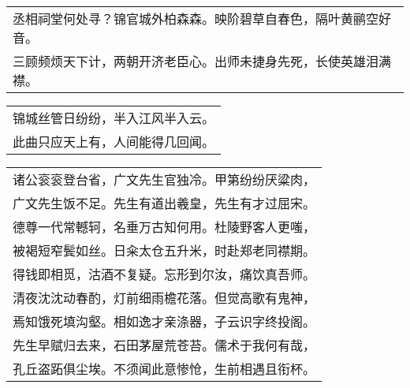 \nopagebreak%
\nopagebreak%
\noindent\begin{minipage}{\linewidth}
  \vskip-3pt\begin{table}[H]
    \centering
    \begin{tabular}{@{}l@{}}
丞相祠堂何处寻？锦官城外柏森森。映阶碧草自春色，隔叶黄鹂空好音。\\
三顾频烦天下计，两朝开济老臣心。出师未捷身先死，长使英雄泪满襟。
    \end{tabular}
  \end{table}
\end{minipage}
\vspace{1cm}


\nopagebreak%
\nopagebreak%
\noindent\begin{minipage}{\linewidth}
  \vskip-3pt\begin{table}[H]
    \centering
    \begin{tabular}{@{}l@{}}
锦城丝管日纷纷，半入江风半入云。\\
此曲只应天上有，人间能得几回闻。
    \end{tabular}
  \end{table}
\end{minipage}
\vspace{1cm}


\nopagebreak%
\nopagebreak%
\noindent\begin{minipage}{\linewidth}
  \vskip-3pt\begin{table}[H]
    \centering
    \begin{tabular}{@{}l@{}}
诸公衮衮登台省，广文先生官独冷。甲第纷纷厌粱肉，\\
广文先生饭不足。先生有道出羲皇，先生有才过屈宋。\\
德尊一代常轗轲，名垂万古知何用。杜陵野客人更嗤，\\
被褐短窄鬓如丝。日籴太仓五升米，时赴郑老同襟期。\\
得钱即相觅，沽酒不复疑。忘形到尔汝，痛饮真吾师。\\
清夜沈沈动春酌，灯前细雨檐花落。但觉高歌有鬼神，\\
焉知饿死填沟壑。相如逸才亲涤器，子云识字终投阁。\\
先生早赋归去来，石田茅屋荒苍苔。儒术于我何有哉，\\
孔丘盗跖俱尘埃。不须闻此意惨怆，生前相遇且衔杯。
    \end{tabular}
  \end{table}
\end{minipage}
\vspace{1cm}


